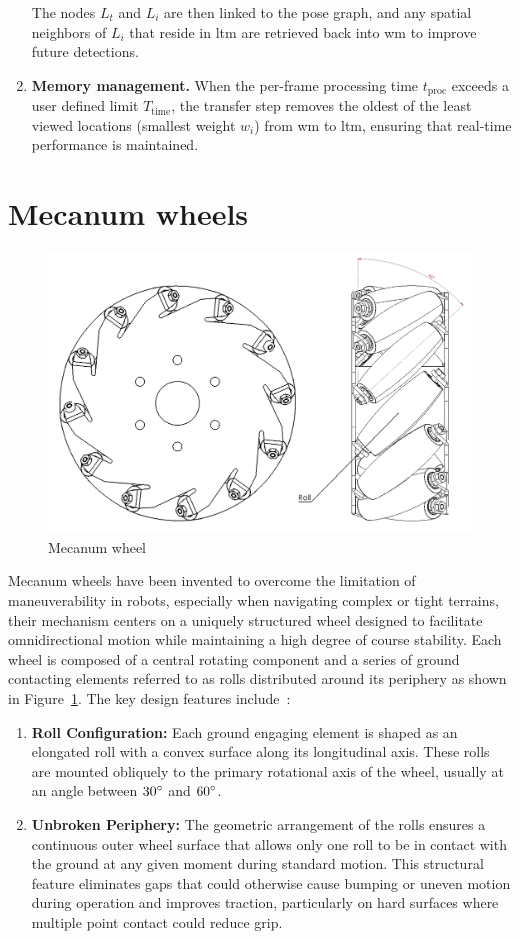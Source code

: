 \begin{enumerate}[label=\alph*)]
        The nodes $L_t$ and $L_i$ are then linked to the pose graph, and any spatial neighbors of $L_i$ that reside in \gls{ltm} are retrieved back into \gls{wm} to improve future detections.

  \item \textbf{Memory management.}
        When the per-frame processing time $t_{\text{proc}}$ exceeds a user defined limit $T_{\text{time}}$, the transfer step removes the oldest of the
        least viewed locations (smallest weight $w_i$) from \gls{wm} to \gls{ltm}, ensuring
        that real-time performance is maintained.
\end{enumerate}

\section{Mecanum wheels}\label{mecanum}

\begin{figure}[H]
  \centering
  \includegraphics[width=0.5\linewidth]{imgs/mecanum_wheel.png}
  \caption{Mecanum wheel}
  \label{fig:mecanum_wheel}
\end{figure}

Mecanum wheels have been invented to overcome the limitation of maneuverability in robots, especially when navigating complex or tight terrains, their mechanism centers on a uniquely structured wheel designed to facilitate omnidirectional motion while maintaining a high degree of course stability. Each wheel is composed of a central rotating component and a series of ground contacting elements referred to as rolls distributed around its periphery as shown in Figure~\ref{fig:mecanum_wheel}. The key design features include~\cite{US3876255A}:

\begin{enumerate}[label=\textbullet]
  \item \textbf{Roll Configuration:}
        Each ground engaging element is shaped as an elongated roll with a convex surface along its longitudinal axis. These rolls are mounted obliquely to the primary rotational axis of the wheel, usually at an angle between $30\degree$ and $60\degree$.
  \item \textbf{Unbroken Periphery:}
        The geometric arrangement of the rolls ensures a continuous outer wheel surface that allows only one roll to be in contact with the ground at any given moment during standard motion. This structural feature eliminates gaps that could otherwise cause bumping or uneven motion during operation and improves traction, particularly on hard surfaces where multiple point contact could reduce grip.
\end{enumerate}

